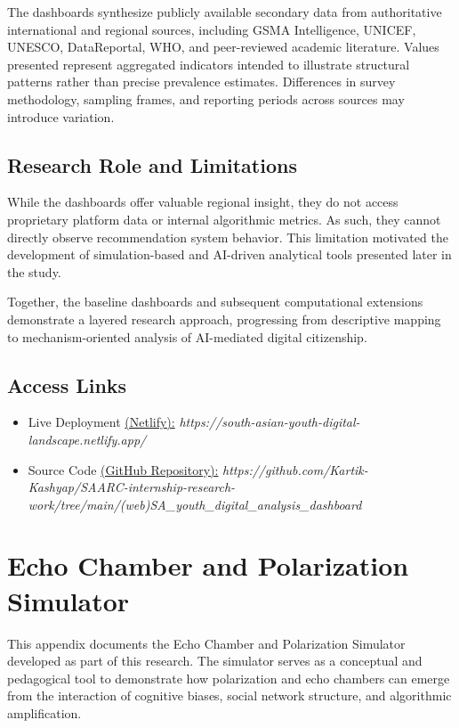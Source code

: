 \documentclass[12pt,a4paper]{report}
\begin{document}
The dashboards synthesize publicly available secondary data from authoritative international and regional sources, including GSMA Intelligence, UNICEF, UNESCO, DataReportal, WHO, and peer-reviewed academic literature. Values presented represent aggregated indicators intended to illustrate structural patterns rather than precise prevalence estimates. Differences in survey methodology, sampling frames, and reporting periods across sources may introduce variation.

\section{Research Role and Limitations}

While the dashboards offer valuable regional insight, they do not access proprietary platform data or internal algorithmic metrics. As such, they cannot directly observe recommendation system behavior. This limitation motivated the development of simulation-based and AI-driven analytical tools presented later in the study.

Together, the baseline dashboards and subsequent computational extensions demonstrate a layered research approach, progressing from descriptive mapping to mechanism-oriented analysis of AI-mediated digital citizenship.

\section{Access Links}
\begin{itemize}
  \item Live Deployment \href{https://south-asian-youth-digital-landscape.netlify.app/}{(Netlify):} \textit{https://south-asian-youth-digital-landscape.netlify.app/}
  \item Source Code \href{https://github.com/Kartik-Kashyap/SAARC-internship-research-work/tree/main/(web)SA\_youth\_digital\_analysis\_dashboard}{(GitHub Repository):} \textit{https://github.com/Kartik-Kashyap/SAARC-internship-research-work/tree/main/(web)SA\_youth\_digital\_analysis\_dashboard}
\end{itemize}




\chapter{Echo Chamber and Polarization Simulator}
\label{app:echo_simulator}

This appendix documents the Echo Chamber and Polarization Simulator developed as part of this research. The simulator serves as a conceptual and pedagogical tool to demonstrate how polarization and echo chambers can emerge from the interaction of cognitive biases, social network structure, and algorithmic amplification.
\end{document}
